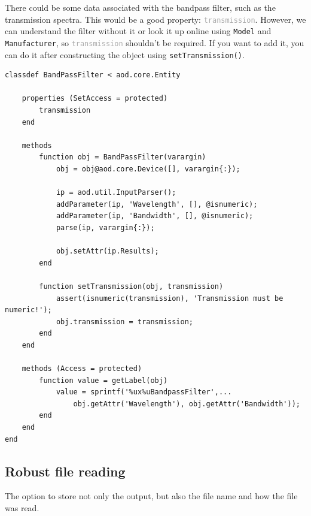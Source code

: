 \documentclass[10pt]{exam}
\newcommand\aodparam[1]{\textcolor{codepurple}{\texttt{#1}}}
\newcommand\aodprop[1]{\textcolor{darkgray}{\texttt{#1}}}
\newcommand\aodfcn[1]{\textcolor{darkteal}{\texttt{#1}}}
\begin{document}
	There could be some data associated with the bandpass filter, such as the transmission spectra. This would be a good property: \aodprop{transmission}. However, we can understand the filter without it or look it up online using \aodparam{Model} and \aodparam{Manufacturer}, so \aodprop{transmission} shouldn't be required. If you want to add it, you can do it after constructing the object using \aodfcn{setTransmission()}.
	\begin{lstlisting}[style=matlab-editor, basicstyle=\mlttfamily\footnotesize]
classdef BandPassFilter < aod.core.Entity

	properties (SetAccess = protected)
		transmission
	end
	
	methods
		function obj = BandPassFilter(varargin)
			obj = obj@aod.core.Device([], varargin{:});
			
			ip = aod.util.InputParser();
			addParameter(ip, 'Wavelength', [], @isnumeric);
			addParameter(ip, 'Bandwidth', [], @isnumeric);
			parse(ip, varargin{:});
			
			obj.setAttr(ip.Results);
		end
		
		function setTransmission(obj, transmission)
			assert(isnumeric(transmission), 'Transmission must be numeric!');
			obj.transmission = transmission;
		end
	end
	
	methods (Access = protected)
		function value = getLabel(obj)
			value = sprintf('%ux%uBandpassFilter',...
				obj.getAttr('Wavelength'), obj.getAttr('Bandwidth'));
		end
	end
end
	\end{lstlisting}	
	\subsection{Robust file reading}
		\noindent The option to store not only the output, but also the file name and how the file was read.
\end{document}
